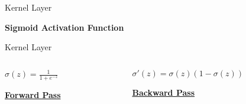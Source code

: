 
\begin{slide}{Kernel Layer}
  \pause

  \vspace{0.02cm}
  \textbf{Sigmoid Activation Function}
\end{slide}

\begin{slide}{Kernel Layer}
\begin{columns}
  \begin{column}{0.5\textwidth}
    \centering
    \pause
    {\large$\sigma(z) = \frac{1}{1 + e^{-z}}$}

    \vspace{0.5cm}
    \href{https://eigen.tuxfamily.org/dox/unsupported/TensorFunctors_8h_source.html}{\textbf{Forward Pass}}
  \end{column}
  \begin{column}{0.5\textwidth}
    \pause
    {\large$\sigma'(z) = \sigma(z)(1 - \sigma(z))$}

    \vspace{0.48cm}
    \hspace{0.4cm}\href{https://github.com/tensorflow/tensorflow/blob/2c8d0dca978a246f54c506aae4587dbce5d3bcf0/tensorflow/core/kernels/cwise_ops_gradients.h\#L51}{\textbf{Backward Pass}}
  \end{column}
\end{columns}
\end{slide}

